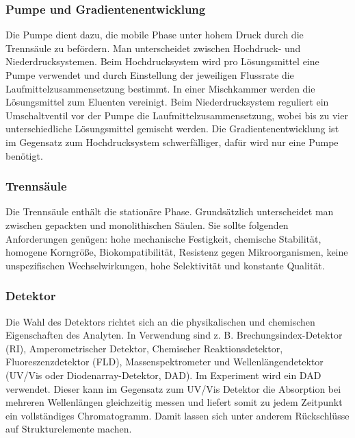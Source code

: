      \subsubsection{Pumpe und Gradientenentwicklung} \label{sec:Pumpe}
     
       Die Pumpe dient dazu, die mobile Phase unter hohem Druck durch die Trennsäule zu befördern. Man unterscheidet zwischen Hochdruck- und Niederdrucksystemen. Beim Hochdrucksystem wird pro Lösungsmittel eine Pumpe verwendet und durch Einstellung der jeweiligen Flussrate die Laufmittelzusammensetzung bestimmt. In einer Mischkammer werden die Lösungsmittel zum Eluenten vereinigt. Beim Niederdrucksystem reguliert ein Umschaltventil vor der Pumpe die Laufmittelzusammensetzung, wobei bis zu vier unterschiedliche Lösungsmittel gemischt werden. Die Gradientenentwicklung ist im Gegensatz zum Hochdrucksystem schwerfälliger, dafür wird nur eine Pumpe benötigt. \citep{SkriptHPLC}
       
     \subsubsection{Trennsäule}
       
       Die Trennsäule enthält die stationäre Phase. Grundsätzlich unterscheidet man zwischen gepackten und monolithischen Säulen. Sie sollte folgenden Anforderungen genügen: hohe mechanische Festigkeit, chemische Stabilität, homogene Korngröße,
Biokompatibilität, Resistenz gegen Mikroorganismen, keine unspezifischen Wechselwirkungen, hohe Selektivität und konstante Qualität. \citep{SkriptHPLC}

     \subsubsection{Detektor}
     
       Die Wahl des Detektors richtet sich an die physikalischen und chemischen Eigenschaften des Analyten. In Verwendung sind z. B. Brechungsindex-Detektor (RI), Amperometrischer Detektor, Chemischer Reaktionsdetektor, Fluoreszenzdetektor (FLD), Massenspektrometer und Wellenlängendetektor (UV/Vis oder Diodenarray-Detektor, DAD). Im Experiment wird ein DAD verwendet. Dieser kann im Gegensatz zum UV/Vis Detektor die Absorption bei mehreren Wellenlängen gleichzeitig messen und liefert somit zu jedem Zeitpunkt ein vollständiges Chromatogramm. Damit lassen sich unter anderem Rückschlüsse auf Strukturelemente machen. \citep[S. 158]{Taschenatlas}
     
